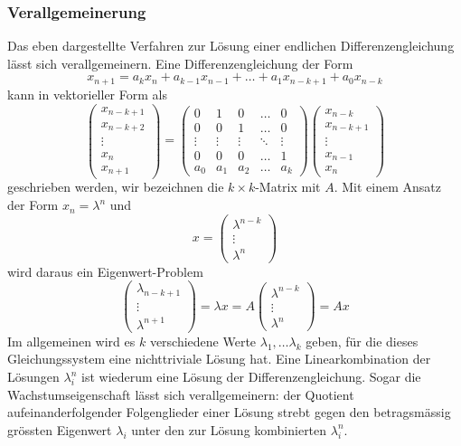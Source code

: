 \subsubsection{Verallgemeinerung}
Das eben dargestellte Verfahren zur Lösung einer endlichen 
Differenzengleichung lässt sich verallgemeinern.
Eine Differenzengleichung der Form
\[
x_{n+1}=a_kx_n+a_{k-1}x_{n-1}+\dots+a_1x_{n-k+1}+a_0x_{n-k}
\]
kann in vektorieller Form als
\[
\begin{pmatrix}
x_{n-k+1}\\
x_{n-k+2}\\
\vdots\\
x_{n}\\
x_{n+1}
\end{pmatrix}
=
\begin{pmatrix}
0&1&0&\dots&0\\
0&0&1&\dots&0\\
\vdots&\vdots&\vdots&\ddots&\vdots\\
0&0&0&\dots&1\\
a_0&a_1&a_2&\dots&a_k
\end{pmatrix}
\begin{pmatrix}
x_{n-k}\\
x_{n-k+1}\\
\vdots\\
x_{n-1}\\
x_n
\end{pmatrix}
\]
geschrieben werden, wir bezeichnen die $k\times k$-Matrix mit $A$.
Mit einem Ansatz der Form $x_n=\lambda^n$ und
\[
x=
\begin{pmatrix}
\lambda^{n-k}\\
\vdots\\
\lambda^n
\end{pmatrix}
\]
wird daraus ein
Eigenwert-Problem
\[
\begin{pmatrix}
\lambda_{n-k+1}\\
\vdots\\
\lambda^{n+1}
\end{pmatrix}
=
\lambda x
=A
\begin{pmatrix}
\lambda^{n-k}\\
\vdots\\
\lambda^n
\end{pmatrix}
=Ax
\]
Im allgemeinen wird es $k$ verschiedene Werte $\lambda_1,\dots\lambda_k$ geben,
für die dieses Gleichungssystem eine nichttriviale Lösung hat.
Eine Linearkombination der Lösungen $\lambda_i^n$ ist wiederum eine
Lösung der Differenzengleichung.
Sogar die Wachstumseigenschaft lässt
sich verallgemeinern: der Quotient aufeinanderfolgender Folgenglieder
einer Lösung strebt gegen den betragsmässig grössten Eigenwert $\lambda_i$
unter den zur Lösung kombinierten $\lambda_i^n$.


